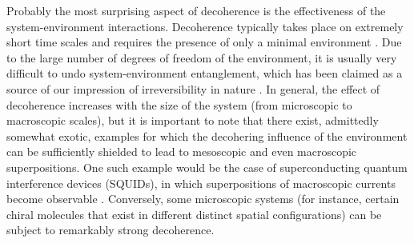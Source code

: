 \documentclass[rmp,aps,amsmath,amsfonts,noshowkeys,noshowpacs,12pt]{revtex4}
\begin{document}
Probably the most surprising aspect of decoherence is the
effectiveness of the system-environment interactions. Decoherence
typically takes place on extremely short time scales and requires the
presence of only a minimal environment \citep{Joos:1985:iu}. Due to
the large number of degrees of freedom of the environment, it is
usually very difficult to undo system-environment entanglement, which
has been claimed as a source of our impression of irreversibility in
nature \citep[see, for
example,][]{Zurek:1982:tv,Zurek:2002:ii,Zurek:1994:om,Kiefer:1998:rz,Zeh:2001:tt}.
In general, the effect of decoherence increases with the size of the
system (from microscopic to macroscopic scales), but it is important
to note that there exist, admittedly somewhat exotic, examples for
which the decohering influence of the environment can be sufficiently
shielded to lead to mesoscopic and even macroscopic superpositions.
One such example would be the case of superconducting quantum
interference devices (SQUIDs), in which superpositions of macroscopic
currents become observable \cite{Friedman:2000:rr,Wal:2000:om}.
Conversely, some microscopic systems (for instance, certain chiral
molecules that exist in different distinct spatial configurations) can
be subject to remarkably strong decoherence.
\end{document}
